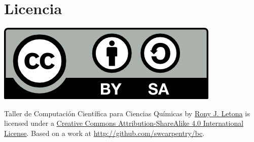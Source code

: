 \documentclass[10pt,letterpaper]{article}
\begin{document}
\section*{Licencia}

\noindent \includegraphics{img/cc_big.png}

\noindent Taller de Computaci\'on Cient\'ifica para Ciencias Qu\'imicas by \href{http://github.com/zronyj/TC3Q}{Rony J. Letona} is licensed under a \href{http://creativecommons.org/licenses/by-sa/4.0/}{Creative Commons Attribution-ShareAlike 4.0 International License}.
Based on a work at \url{http://github.com/swcarpentry/bc}.
\end{document}
